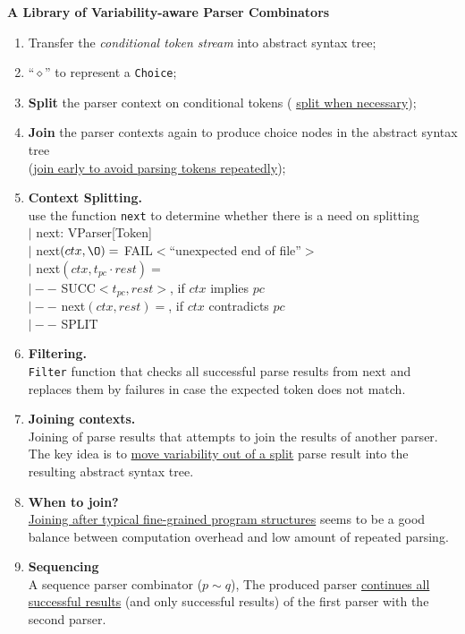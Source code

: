 \documentclass[12pt]{article}
\begin{document}
\textbf{A Library of Variability-aware Parser Combinators}\newline
\begin{enumerate}
	\item Transfer the \textit{conditional token stream} into abstract syntax tree;
	\item ``$\diamond$'' to represent a \texttt{Choice};
	\item \textbf{Split} the parser context on conditional tokens (
	\underline{split when necessary});
	\item \textbf{Join} the parser contexts again to produce choice nodes in the abstract syntax tree \\(\underline{join early to avoid parsing tokens repeatedly});
	\item \textbf{Context Splitting.}\\
	use the function \texttt{next} to determine whether there is a need on splitting\\
	$ \mid $ next: VParser[Token]\\
	$ \mid $ next$\left ( ctx, \O \right )=$ FAIL$<$``unexpected end of file''$>$\\
	$ \mid $ next$\left ( ctx, t_{pc}\cdot rest \right )=$\\
	$ \mid --$ SUCC$<t_{pc},rest>$, if $ctx$ implies $pc$\\
	$ \mid --$ next$\left ( ctx, rest \right )=$, if $ctx$ contradicts $pc$\\
	$ \mid --$ SPLIT\\
	\item \textbf{Filtering.}\\
	\texttt{Filter} function that checks all successful parse results from next and replaces them by failures in case the expected token does not match.
	\item \textbf{Joining contexts.}\\
	Joining of parse results that attempts to join the results of another parser. The key idea is to \underline{move variability out of a split} parse result into the resulting abstract syntax tree.
	\item \textbf{When to join?}\\ 
	\underline{Joining after typical fine-grained program structures} seems to be a good balance between computation overhead and low amount of repeated parsing. 
	\item \textbf{Sequencing}\\ A sequence parser combinator ($p\sim q$), The produced parser \underline{continues all successful results} (and only successful results) of the first parser with the second parser. 

\end{enumerate}
\end{document}
